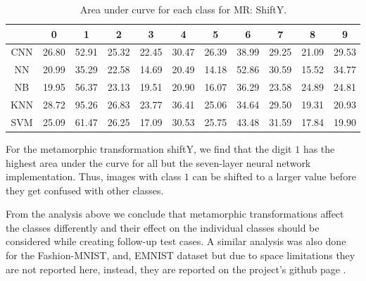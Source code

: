     \begin{table}[H]
    \centering
    \begin{tabular}{|c|c|c|c|c|c|c|c|c|c|c|}
    \hline
    & 0 & 1 & 2 & 3 & 4 & 5 & 6 & 7 & 8 & 9 \\
    \hline
    CNN & 26.80 & \cellcolor{green!25}52.91 & 25.32 & 22.45 & 30.47 & 26.39 & 38.99 & 29.25 & \cellcolor{red!25}21.09 & 29.53 \\ 
    \hline
    NN &  20.99 & 35.29 & 22.58 & 14.69 & 20.49 & \cellcolor{red!25}14.18 & \cellcolor{green!25}52.86 & 30.59 & 15.52 & 34.77 \\
    \hline
    NB & 19.95 & \cellcolor{green!25}56.37 & 23.13 & 19.51 & 20.90 & \cellcolor{red!25}16.07 & 36.29 & 23.58 & 24.89 & 24.81 \\
    \hline
    KNN & 28.72 & \cellcolor{green!25}95.26 & 26.83 & 23.77 & 36.41 & 25.06 & 34.64 & 29.50 & \cellcolor{red!25}19.31 & 20.93 \\
    \hline
    SVM & 25.09 & \cellcolor{green!25}61.47 & 26.25 & \cellcolor{red!25}17.09 & 30.53 & 25.75 & 43.48 & 31.59 & 17.84 & 19.90  \\
    \hline
    \end{tabular}
    \caption{Area under curve for each class for MR: ShiftY.}
    \label{tbl:test-file-formatShiftY}
    \end{table}
    For the metamorphic transformation shiftY, we find that the digit $1$ has the highest area under the curve for all but the seven-layer neural network implementation. Thus, images with class $1$ can be shifted to a larger value before they get confused with other classes.
    
From the analysis above we conclude that metamorphic transformations affect the classes differently and their effect on the individual classes should be considered while creating follow-up test cases. A similar analysis was also done for the Fashion-MNIST, and, EMNIST dataset but due to space limitations they are not reported here, instead, they are reported on the project's github page \cite{abhishek2020}.

